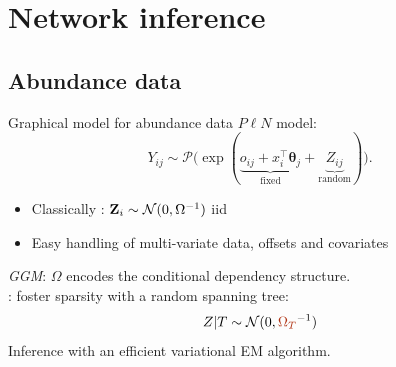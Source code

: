 \documentclass[11pt]{beamer}
\newcommand\thetab{{\boldsymbol{\theta}}}
\newcommand\Zb{{\bf Z}}
\newcommand{\emphase}[1]{\textcolor{Complement}{#1}}
\begin{document}
\section{Network inference}
\subsection{Abundance data}
\begin{frame}{Graphical model for abundance data}
$P\ell N$ model:
   \large{ $$ Y_{ij} \sim \mathcal{P}\big(\exp(\underbrace{o_{ij} + x_i^\intercal \thetab_j}_{\text{fixed}} + \underbrace{Z_{ij}}_{\text{random}})\big).$$} \normalsize 
     \pause
   \begin{itemize}
       \item Classically \citep{AiH89}: $ \Zb_i \sim\mathcal{N}(0,\Omega^{-1})$ iid
       \item Easy handling of multi-variate data, offsets and covariates \citep{CMR18}
   \end{itemize}
   \bigskip
     \textit{GGM}: $\Omega$ encodes the \emphase{conditional dependency} structure.\\
   \pause
   \bigskip
   \citet{MRA20}: foster sparsity with a random spanning tree: $$Z|T \sim \mathcal{N}(0, \emphase{\Omega_T}^{-1}) $$
 Inference with an efficient variational EM algorithm.

\end{frame}

\end{document}
